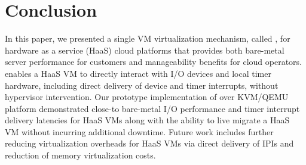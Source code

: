 \section{Conclusion}

In this paper, we presented a single VM virtualization 
mechanism, called \na, for hardware as a service (HaaS) cloud platforms
that provides both bare-metal server performance for customers
and manageability benefits for cloud operators.
\na enables a HaaS VM to directly interact with I/O devices and 
local timer hardware, including direct delivery of device and 
timer interrupts, without hypervisor intervention.
Our prototype implementation of \na over KVM/QEMU platform 
demonstrated close-to bare-metal I/O performance and
timer interrupt delivery latencies for HaaS VMs along with the
ability to live migrate a HaaS VM without incurring 
additional downtime. 
Future work includes further reducing virtualization overheads
for HaaS VMs via direct delivery of IPIs and reduction of
memory virtualization costs.
